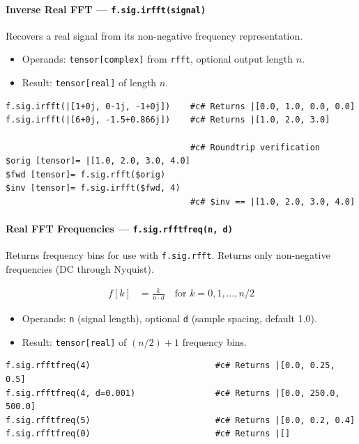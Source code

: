 \paragraph{Inverse Real FFT --- \texttt{f.sig.irfft(signal)}}
Recovers a real signal from its non-negative frequency representation.

\begin{itemize}
\item Operands: \texttt{tensor[complex]} from \texttt{rfft}, optional output length $n$.
\item Result: \texttt{tensor[real]} of length $n$.
\end{itemize}

\begin{verbatim}
f.sig.irfft(|[1+0j, 0-1j, -1+0j])    #c# Returns |[0.0, 1.0, 0.0, 0.0]
f.sig.irfft(|[6+0j, -1.5+0.866j])    #c# Returns |[1.0, 2.0, 3.0]

                                     #c# Roundtrip verification
$orig [tensor]= |[1.0, 2.0, 3.0, 4.0]
$fwd [tensor]= f.sig.rfft($orig)
$inv [tensor]= f.sig.irfft($fwd, 4)
                                     #c# $inv == |[1.0, 2.0, 3.0, 4.0]
\end{verbatim}

\paragraph{Real FFT Frequencies --- \texttt{f.sig.rfftfreq(n, d)}}
Returns frequency bins for use with \texttt{f.sig.rfft}. Returns only non-negative frequencies (DC through Nyquist).

\begin{align}
f[k] &= \frac{k}{n \cdot d} \quad \text{for } k = 0, 1, \ldots, n/2 \label{eq:sig-rfftfreq}
\end{align}

\begin{itemize}
\item Operands: \texttt{n} (signal length), optional \texttt{d} (sample spacing, default 1.0).
\item Result: \texttt{tensor[real]} of $(n/2)+1$ frequency bins.
\end{itemize}

\begin{verbatim}
f.sig.rfftfreq(4)                         #c# Returns |[0.0, 0.25, 0.5]
f.sig.rfftfreq(4, d=0.001)                #c# Returns |[0.0, 250.0, 500.0]
f.sig.rfftfreq(5)                         #c# Returns |[0.0, 0.2, 0.4]
f.sig.rfftfreq(0)                         #c# Returns |[]
\end{verbatim}


